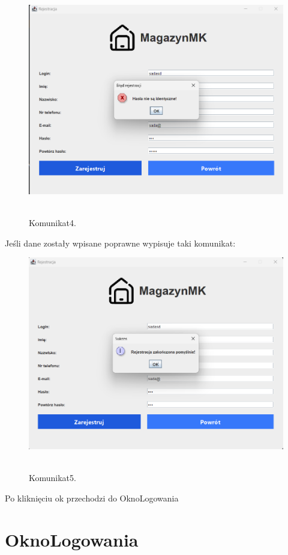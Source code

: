 \begin{figure}[H]
    \centering
    \includegraphics[width=.9\linewidth]{figures/RejestracjaKom4.png}\
    \caption{Komunikat4.\label{Komunikat4}}
\end{figure}

Jeśli dane zostały wpisane poprawne wypisuje taki komunikat:

\begin{figure}[H]
    \centering
    \includegraphics[width=.9\linewidth]{figures/RejestracjaKom5.png}\
    \caption{Komunikat5.\label{Komunikat5}}
\end{figure}

Po kliknięciu ok przechodzi do OknoLogowania


\section{OknoLogowania}
\label{sec:OknoLogowania}

